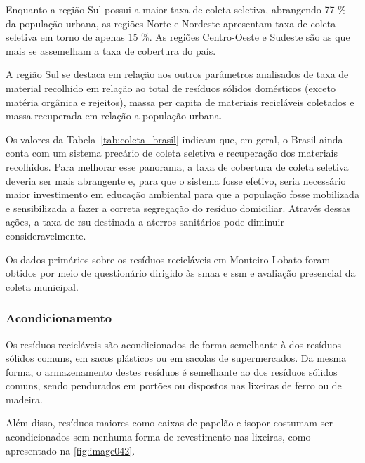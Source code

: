 	Enquanto a região Sul possui a maior taxa de coleta seletiva, abrangendo 77 \% da população urbana, as regiões Norte e Nordeste apresentam taxa de coleta seletiva em torno de apenas 15 \%. As regiões Centro-Oeste e Sudeste são as que mais se assemelham a taxa de cobertura do país.
	
	A região Sul se destaca em relação aos outros parâmetros analisados de taxa de material recolhido em relação ao total de resíduos sólidos domésticos (exceto matéria orgânica e rejeitos), massa per capita de materiais recicláveis coletados e massa recuperada em relação a população urbana.
	
	
	
	Os valores da Tabela~\ref{tab:coleta_brasil} indicam que, em geral, o Brasil ainda conta com um sistema precário de coleta seletiva e recuperação dos materiais recolhidos. Para melhorar esse panorama, a taxa de cobertura de coleta seletiva deveria ser mais abrangente e, para que o sistema fosse efetivo, seria necessário maior investimento em educação ambiental para que a população fosse mobilizada e sensibilizada a fazer a correta segregação do resíduo domiciliar. Através dessas ações, a taxa de \gls{rsu} destinada a aterros sanitários pode diminuir consideravelmente.
	
	Os dados primários sobre os resíduos recicláveis em Monteiro Lobato foram obtidos por meio de questionário dirigido às \gls{smaa} e \gls{ssm} e avaliação presencial da coleta municipal.
	
	\subsubsection{Acondicionamento}
	
	Os resíduos recicláveis são acondicionados de forma semelhante à dos resíduos sólidos comuns, em sacos plásticos ou em sacolas de supermercados. Da mesma forma, o armazenamento destes resíduos é semelhante ao dos resíduos sólidos comuns, sendo pendurados em portões ou dispostos nas lixeiras de ferro ou de madeira.
	
	Além disso, resíduos maiores como caixas de papelão e isopor costumam ser acondicionados sem nenhuma forma de revestimento nas lixeiras, como apresentado na \autoref{fig:image042}.
	

